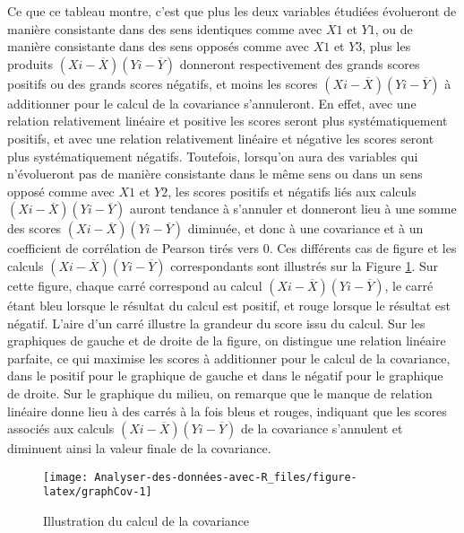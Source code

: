 \documentclass[
]{book}
\begin{document}
Ce que ce tableau montre, c'est que plus les deux variables étudiées évolueront de manière consistante dans des sens identiques comme avec \(X1\) et \(Y1\), ou de manière consistante dans des sens opposés comme avec \(X1\) et \(Y3\), plus les produits \((X{i} - \overline{X}) (Y{i} - \overline{Y})\) donneront respectivement des grands scores positifs ou des grands scores négatifs, et moins les scores \((X{i} - \overline{X}) (Y{i} - \overline{Y})\) à additionner pour le calcul de la covariance s'annuleront. En effet, avec une relation relativement linéaire et positive les scores seront plus systématiquement positifs, et avec une relation relativement linéaire et négative les scores seront plus systématiquement négatifs. Toutefois, lorsqu'on aura des variables qui n'évolueront pas de manière consistante dans le même sens ou dans un sens opposé comme avec \(X1\) et \(Y2\), les scores positifs et négatifs liés aux calculs \((X{i} - \overline{X}) (Y{i} - \overline{Y})\) auront tendance à s'annuler et donneront lieu à une somme des scores \((X{i} - \overline{X}) (Y{i} - \overline{Y})\) diminuée, et donc à une covariance et à un coefficient de corrélation de Pearson tirés vers 0. Ces différents cas de figure et les calculs \((X{i} - \overline{X}) (Y{i} - \overline{Y})\) correspondants sont illustrés sur la Figure \ref{fig:graphCov}. Sur cette figure, chaque carré correspond au calcul \((X{i} - \overline{X}) (Y{i} - \overline{Y})\), le carré étant bleu lorsque le résultat du calcul est positif, et rouge lorsque le résultat est négatif. L'aire d'un carré illustre la grandeur du score issu du calcul. Sur les graphiques de gauche et de droite de la figure, on distingue une relation linéaire parfaite, ce qui maximise les scores à additionner pour le calcul de la covariance, dans le positif pour le graphique de gauche et dans le négatif pour le graphique de droite. Sur le graphique du milieu, on remarque que le manque de relation linéaire donne lieu à des carrés à la fois bleus et rouges, indiquant que les scores associés aux calculs \((X{i} - \overline{X}) (Y{i} - \overline{Y})\) de la covariance s'annulent et diminuent ainsi la valeur finale de la covariance.

\begin{figure}

{\centering \texttt{[image: Analyser-des-données-avec-R\_files/figure-latex/graphCov-1]} 

}

\caption{Illustration du calcul de la covariance}\label{fig:graphCov}
\end{figure}
\end{document}
